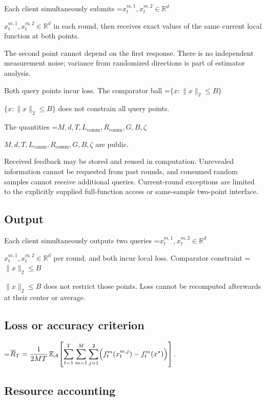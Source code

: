 \documentclass[10pt,a4paper]{article}
\newcommand{\AtlasMath}[1]{\par\begingroup\centering\setbox0=\hbox{$\displaystyle #1$}\ifdim\wd0>1.4\linewidth\typeout{ATLAS WIDE FORMULA: \the\wd0}\fi\ifdim\wd0>\linewidth\resizebox{\linewidth}{!}{\box0}\else\box0\fi\par\endgroup}
\newcommand{\AtlasInlineMath}[1]{\begingroup\setbox0=\hbox{$#1$}\ifdim\wd0>.4\linewidth\endgroup\AtlasMath{#1}\else\endgroup$#1$\fi}
\begin{document}
Each client simultaneously submits \AtlasInlineMath{x_t^{m,1},x_t^{m,2}\in\mathbb{R}^d} in each round, then receives exact values of the same current local function at both points.



The second point cannot depend on the first response. There is no independent measurement noise; variance from randomized directions is part of estimator analysis.



Both query points incur loss. The comparator ball \AtlasInlineMath{\{x:\|x\|_2\le B\}} does not constrain all query points.



The quantities \AtlasInlineMath{M,d,T,L_{\mathrm{comm}},R_{\mathrm{comm}},G,B,\zeta} are public.



Received feedback may be stored and reused in computation. Unrevealed information cannot be requested from past rounds, and consumed random samples cannot receive additional queries. Current-round exceptions are limited to the explicitly supplied full-function access or same-sample two-point interface.



\subsection{Output}


Each client simultaneously outputs two queries \AtlasInlineMath{x_t^{m,1},x_t^{m,2}\in\mathbb{R}^d} per round, and both incur local loss. Comparator constraint \AtlasInlineMath{\|x\|_2\le B} does not restrict those points. Loss cannot be recomputed afterwards at their center or average.



\subsection{Loss or accuracy criterion}



\AtlasMath{\overline R_T=\frac1{2MT}\,\mathbb{E}_{\mathcal{A}}\!\left[\sum_{t=1}^{T}\sum_{m=1}^{M}\sum_{j=1}^{2}\Bigl(f_t^m(x_t^{m,j})-f_t^m(x^\star)\Bigr)\right].}




\subsection{Resource accounting}
\end{document}
